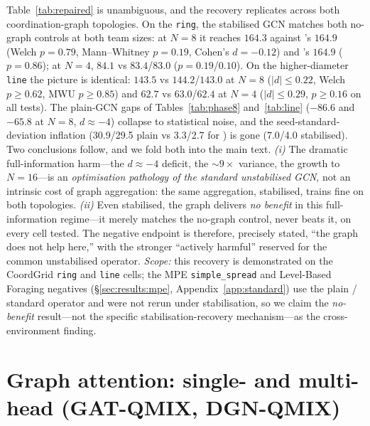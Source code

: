 \begin{appendices}
Table~\ref{tab:repaired} is unambiguous, and the recovery replicates across
both coordination-graph topologies. On the \texttt{ring}, the stabilised GCN
matches both
no-graph controls at both team sizes: at $N{=}8$ it reaches $164.3$ against
\mlpqmix's $164.9$ (Welch $p=0.79$, Mann--Whitney $p=0.19$, Cohen's
$d=-0.12$) and \qmix's $164.9$ ($p=0.86$); at $N{=}4$, $84.1$ vs
$83.4$/$83.0$ ($p=0.19$/$0.10$). On the higher-diameter \texttt{line} the
picture is identical: $143.5$ vs $144.2$/$143.0$ at $N{=}8$ ($|d|\le0.22$,
Welch $p\ge0.62$, MWU $p\ge0.85$) and $62.7$ vs $63.0$/$62.4$ at $N{=}4$
($|d|\le0.29$, $p\ge0.16$ on all tests). The plain-GCN gaps of
Tables~\ref{tab:phase8} and~\ref{tab:line}
($-86.6$ and $-65.8$ at $N{=}8$, $d\approx-4$) collapse to statistical
noise, and the
seed-standard-deviation inflation (30.9/29.5 plain vs 3.3/2.7 for \mlpqmix)
is gone
(7.0/4.0 stabilised). Two conclusions follow, and we fold both into the main
text. \emph{(i)} The dramatic full-information harm---the $d\approx-4$
deficit, the ${\sim}9\times$ variance, the growth to $N{=}16$---is an
\emph{optimisation pathology of the standard unstabilised GCN}, not an
intrinsic cost of graph aggregation: the same aggregation, stabilised,
trains fine on both topologies. \emph{(ii)} Even stabilised, the graph
delivers \emph{no
benefit} in this full-information regime---it merely matches the no-graph
control, never beats it, on every cell tested. The negative endpoint is
therefore, precisely
stated, ``the graph does not help here,'' with the stronger ``actively
harmful'' reserved for the common unstabilised operator. \emph{Scope:} this
recovery is demonstrated on the CoordGrid \texttt{ring} and \texttt{line}
cells; the MPE
\texttt{simple\_spread} and Level-Based Foraging negatives
(\S\ref{sec:results:mpe}, Appendix~\ref{app:standard}) use the plain /
standard operator and were not rerun under stabilisation, so we claim the
\emph{no-benefit} result---not the specific stabilisation-recovery
mechanism---as the cross-environment finding.

\section{Graph attention: single- and multi-head (GAT-QMIX, DGN-QMIX)}
\label{app:gat}


\end{appendices}
